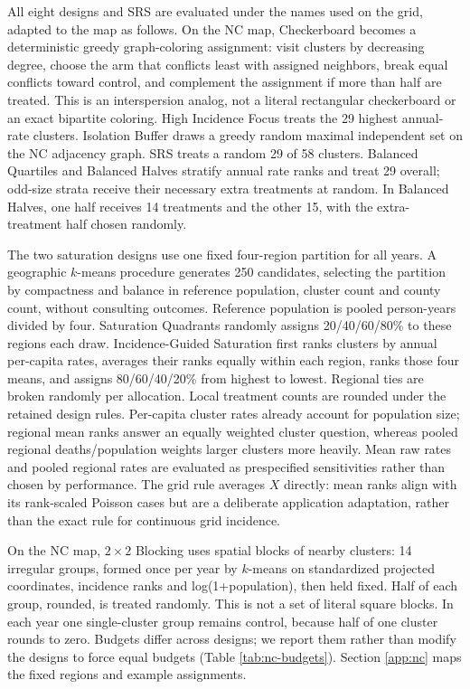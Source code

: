 \documentclass[11pt]{article}
\begin{document}
All eight designs and SRS are evaluated under the names used on the grid, adapted to the map as follows. On the NC map, Checkerboard becomes a deterministic greedy graph-coloring assignment: visit clusters by decreasing
degree, choose the arm that conflicts least with assigned neighbors,
break equal conflicts toward control, and complement the assignment if
more than half are treated. This is an interspersion analog, not a
literal rectangular checkerboard or an exact bipartite coloring. High
Incidence Focus treats the 29 highest annual-rate clusters. Isolation
Buffer draws a greedy random maximal independent set on the NC adjacency graph. SRS treats a random 29 of 58 clusters. Balanced Quartiles and
Balanced Halves stratify annual rate ranks and treat 29 overall;
odd-size strata receive their necessary extra treatments at random. In
Balanced Halves, one half receives 14 treatments and the other 15, with
the extra-treatment half chosen randomly.

The two saturation designs use one fixed four-region partition for all
years. A geographic $k$-means procedure generates 250 candidates, selecting the partition by compactness and balance in
reference population, cluster count and county count, without consulting
outcomes. Reference population is pooled person-years divided by four.
Saturation Quadrants randomly assigns 20/40/60/80\% to these regions each
draw. Incidence-Guided Saturation first ranks clusters by annual per-capita rates,
averages their ranks equally within each region, ranks those four means,
and assigns 80/60/40/20\% from highest to lowest. Regional ties are
broken randomly per allocation. Local treatment counts are rounded under
the retained design rules. Per-capita cluster rates already account for
population size; regional mean ranks answer an equally weighted cluster
question, whereas pooled regional deaths/population weights larger
clusters more heavily. Mean raw rates and pooled regional rates are
evaluated as prespecified sensitivities rather than chosen by
performance. The grid rule averages \(X\) directly: mean ranks align with its rank-scaled Poisson cases but are a deliberate application adaptation, rather than the exact rule for continuous grid incidence.

On the NC map, $2\times2$ Blocking uses spatial blocks of nearby clusters: 14 irregular groups, formed once per year by \(k\)-means on standardized
projected coordinates, incidence ranks and log(1+population), then held fixed. Half of each group, rounded, is treated randomly. This is not a
set of literal square blocks. In each year one single-cluster group remains control, because half of one cluster rounds to zero. Budgets differ across designs; we report them rather than modify the designs to force equal budgets (Table \ref{tab:nc-budgets}). Section \ref{app:nc} maps the
fixed regions and example assignments.
\end{document}
